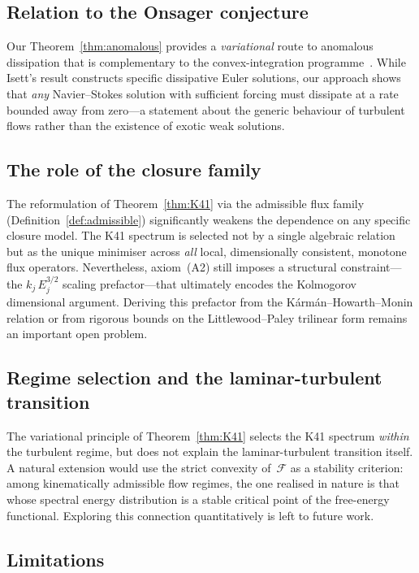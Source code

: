 \documentclass[12pt,a4paper]{article}
\theoremstyle{definition}
\theoremstyle{plain}
\theoremstyle{remark}
\begin{document}
\subsection{Relation to the Onsager conjecture}

Our Theorem~\ref{thm:anomalous} provides a \emph{variational} route to
anomalous dissipation that is complementary to the convex-integration
programme~\cite{Isett18}.  While Isett's result constructs specific
dissipative Euler solutions, our approach shows that \emph{any}
Navier--Stokes solution with sufficient forcing must dissipate at a rate
bounded away from zero---a statement about the generic behaviour of
turbulent flows rather than the existence of exotic weak solutions.

\subsection{The role of the closure family}

The reformulation of Theorem~\ref{thm:K41} via the admissible flux
family (Definition~\ref{def:admissible}) significantly weakens the
dependence on any specific closure model.  The K41 spectrum is selected
not by a single algebraic relation but as the unique minimiser across
\emph{all} local, dimensionally consistent, monotone flux operators.
Nevertheless, axiom~(A2) still imposes a structural constraint---the
$k_j\,E_j^{3/2}$ scaling prefactor---that ultimately encodes the
Kolmogorov dimensional argument.  Deriving this prefactor from the
K\'arm\'an--Howarth--Monin relation or from rigorous bounds on the
Littlewood--Paley trilinear form remains an important open problem.

\subsection{Regime selection and the laminar-turbulent transition}

The variational principle of Theorem~\ref{thm:K41} selects the K41
spectrum \emph{within} the turbulent regime, but does not explain the
laminar-turbulent transition itself.  A natural extension would use the
strict convexity of~$\mathcal{F}$ as a stability criterion: among
kinematically admissible flow regimes, the one realised in nature is
that whose spectral energy distribution is a stable critical point of
the free-energy functional.  Exploring this connection quantitatively
is left to future work.

\subsection{Limitations}
\end{document}
